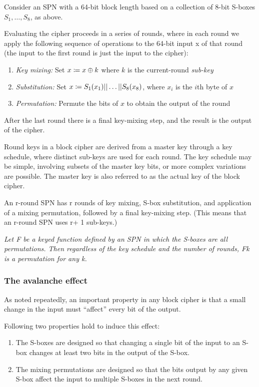 \documentclass[12pt]{article}
\begin{document}
Consider an SPN with a 64-bit block length based on a collection of 8-bit S-boxes $S_1,\dots,S_8$, as above.

Evaluating the cipher proceeds in a series of rounds, where in each round we apply the following sequence of operations to the 64-bit input x of that round (the input to the first round is just the input to the cipher):
\begin{enumerate}
\item \emph{Key mixing:} Set $x\coloneqq x\oplus k$ where $k$ is the current-round \emph{sub-key}
\item \emph{Substitution:} Set $x\coloneqq S_1(x_1)||\dots||S_8(x_8)$, where $x_i$ is the $i$th byte of $x$ 
\item \emph{Permutation:} Permute the bits of $x$ to obtain the output of the round
\end{enumerate}

After the last round there is a final key-mixing step, and the result is the output of the cipher.

Round keys in a block cipher are derived from a master key through a key schedule, where distinct sub-keys are used for each round. The key schedule may be simple, involving subsets of the master key bits, or more complex variations are possible. The master key is also referred to as the actual key of the block cipher.

An r-round SPN has r rounds of key mixing, S-box substitution, and application of a mixing permutation, followed by a final key-mixing step. (This means that an r-round SPN uses r+ 1 sub-keys.)

\emph{Let F be a keyed function defined by an SPN in which the S-boxes are all permutations. Then regardless of the key schedule and the number of rounds, Fk is a permutation for any k.}

\subsubsection{The avalanche effect}
As noted repeatedly, an important property in any block cipher is that a small change in the input must “aﬀect” every bit of the output.

Following two properties hold to induce this effect:
\begin{enumerate}
\item The S-boxes are designed so that changing a single bit of the input to an S-box changes at least two bits in the output of the S-box.
\item The mixing permutations are designed so that the bits output by any given S-box aﬀect the input to multiple S-boxes in the next round.
\end{enumerate}
\end{document}
